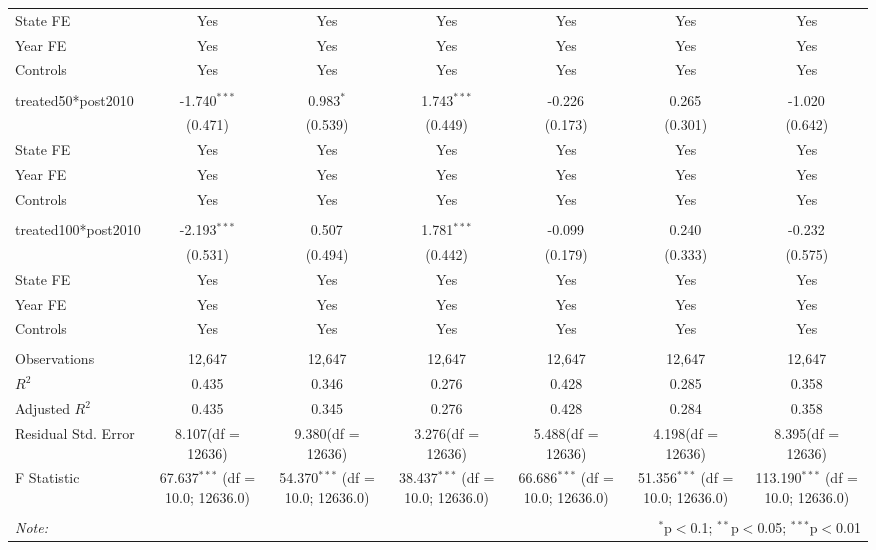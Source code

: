 \documentclass[12pt]{article}
\begin{document}
\begin{table}[!htbp]
\begin{tabular}{@{\extracolsep{5pt}}lcccccc}
 State FE & Yes & Yes & Yes & Yes & Yes & Yes \\
 Year FE & Yes & Yes & Yes & Yes & Yes & Yes \\
 Controls & Yes & Yes & Yes & Yes & Yes & Yes \\
\hline \\[-1.8ex]
 treated50*post2010 & -1.740$^{***}$ & 0.983$^{*}$ & 1.743$^{***}$ & -0.226$^{}$ & 0.265$^{}$ & -1.020$^{}$ \\
  & (0.471) & (0.539) & (0.449) & (0.173) & (0.301) & (0.642) \\
 State FE & Yes & Yes & Yes & Yes & Yes & Yes \\
 Year FE & Yes & Yes & Yes & Yes & Yes & Yes \\
 Controls & Yes & Yes & Yes & Yes & Yes & Yes \\
\hline \\[-1.8ex]
 treated100*post2010 & -2.193$^{***}$ & 0.507$^{}$ & 1.781$^{***}$ & -0.099$^{}$ & 0.240$^{}$ & -0.232$^{}$ \\
  & (0.531) & (0.494) & (0.442) & (0.179) & (0.333) & (0.575) \\
 State FE & Yes & Yes & Yes & Yes & Yes & Yes \\
 Year FE & Yes & Yes & Yes & Yes & Yes & Yes \\
 Controls & Yes & Yes & Yes & Yes & Yes & Yes \\
\hline \\[-1.8ex]
 Observations & 12,647 & 12,647 & 12,647 & 12,647 & 12,647 & 12,647 \\
 $R^2$ & 0.435 & 0.346 & 0.276 & 0.428 & 0.285 & 0.358 \\
 Adjusted $R^2$ & 0.435 & 0.345 & 0.276 & 0.428 & 0.284 & 0.358 \\
 Residual Std. Error & 8.107(df = 12636) & 9.380(df = 12636) & 3.276(df = 12636) & 5.488(df = 12636) & 4.198(df = 12636) & 8.395(df = 12636)  \\
 F Statistic & 67.637$^{***}$ (df = 10.0; 12636.0) & 54.370$^{***}$ (df = 10.0; 12636.0) & 38.437$^{***}$ (df = 10.0; 12636.0) & 66.686$^{***}$ (df = 10.0; 12636.0) & 51.356$^{***}$ (df = 10.0; 12636.0) & 113.190$^{***}$ (df = 10.0; 12636.0) \\
\hline
\hline \\[-1.8ex]
\textit{Note:} & \multicolumn{6}{r}{$^{*}$p$<$0.1; $^{**}$p$<$0.05; $^{***}$p$<$0.01} \\
\end{tabular}
\end{table}
\end{document}
